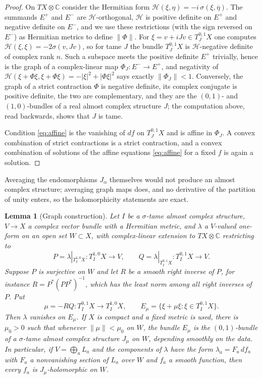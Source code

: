 \documentclass[11pt]{article}
\newtheorem{lemma}[theorem]{Lemma}
\theoremstyle{remark}
\newcommand{\C}{\mathbb C}
\begin{document}
\begin{proof}
On $TX\otimes\C$ consider the Hermitian form
$\mathcal H(\xi,\eta)=-i\,\sigma(\xi,\overline\eta)$. The summands $E^+$
and $E^-$ are $\mathcal H$-orthogonal, $\mathcal H$ is positive
definite on $E^+$ and negative definite on $E^-$, and we use these
restrictions (with the sign reversed on $E^-$) as Hermitian metrics to
define $\lVert\Phi\rVert$. For $\xi=v+iJv\in T^{0,1}_JX$ one computes
$\mathcal H(\xi,\xi)=-2\sigma(v,Jv)$, so for tame $J$ the bundle
$T^{0,1}_JX$ is $\mathcal H$-negative definite of complex rank $n$.
Such a subspace meets the positive definite $E^+$ trivially, hence is
the graph of a complex-linear map $\Phi_J\colon E^-\to E^+$, and
negativity of $\mathcal H(\xi+\Phi\xi,\xi+\Phi\xi)=-|\xi|^2+|\Phi\xi|^2$
says exactly $\lVert\Phi_J\rVert<1$. Conversely, the graph of a strict
contraction $\Phi$ is negative definite, its complex conjugate is
positive definite, the two are complementary, and they are the
$(0,1)$- and $(1,0)$-bundles of a real almost complex structure $J$;
the computation above, read backwards, shows that $J$ is tame.

Condition \eqref{eq:affine} is the vanishing of $df$ on $T^{0,1}_JX$
and is affine in $\Phi_J$. A convex combination of strict contractions
is a strict contraction, and a convex combination of solutions of the
affine equations \eqref{eq:affine} for a fixed $f$ is again a solution.
\end{proof}

Averaging the endomorphisms $J_\alpha$ themselves would not produce an
almost complex structure; averaging graph maps does, and no derivative
of the partition of unity enters, so the holomorphicity statements are
exact.

\begin{lemma}[Graph construction]\label{lem:graph}
Let $I$ be a $\sigma$-tame almost complex structure, $V\to X$ a complex
vector bundle with a Hermitian metric, and $\lambda$ a $V$-valued
one-form on an open set $W\subset X$, with complex-linear extension to
$TX\otimes\C$ restricting to
\[
 P=\lambda|_{T^{1,0}_IX}\colon T^{1,0}_IX\to V,\qquad
 Q=\lambda|_{T^{0,1}_IX}\colon T^{0,1}_IX\to V .
\]
Suppose $P$ is surjective on $W$ and let $R$ be a smooth right inverse
of $P$, for instance $R=P^*(PP^*)^{-1}$, which has the least norm among
all right inverses of $P$. Put
\begin{equation}\label{eq:graph}
 \mu=-RQ\colon T^{0,1}_IX\to T^{1,0}_IX,\qquad
 E_\mu=\{\xi+\mu\xi:\xi\in T^{0,1}_IX\}.
\end{equation}
Then $\lambda$ vanishes on $E_\mu$. If $X$ is compact and a fixed
metric is used, there is $\mu_0>0$ such that whenever
$\lVert\mu\rVert<\mu_0$ on $W$, the bundle $E_\mu$ is the $(0,1)$-bundle
of a $\sigma$-tame almost complex structure $J_\mu$ on $W$, depending
smoothly on the data. In particular, if $V=\bigoplus_aL_a$ and the
components of $\lambda$ have the form $\lambda_a=F_a\,df_a$ with $F_a$
a nonvanishing section of $L_a$ over $W$ and $f_a$ a smooth function,
then every $f_a$ is $J_\mu$-holomorphic on $W$.
\end{lemma}
\end{document}
